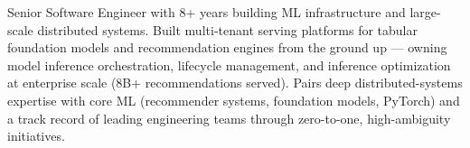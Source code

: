 
\begin{cvparagraph}
Senior Software Engineer with 8+ years building ML infrastructure and large-scale distributed systems. Built multi-tenant serving platforms for tabular foundation models and recommendation engines from the ground up --- owning model inference orchestration, lifecycle management, and inference optimization at enterprise scale (8B+ recommendations served). Pairs deep distributed-systems expertise with core ML (recommender systems, foundation models, PyTorch) and a track record of leading engineering teams through zero-to-one, high-ambiguity initiatives.
\end{cvparagraph}
